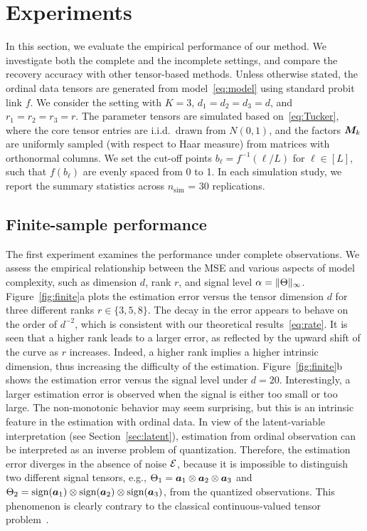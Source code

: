 \documentclass{article}
\theoremstyle{plain}
\theoremstyle{definition}
\begin{document}
\section{Experiments}\label{sec:experiment}
In this section, we evaluate the empirical performance of our method. We investigate both the complete and the incomplete settings, and compare the recovery accuracy with other tensor-based methods. Unless otherwise stated, the ordinal data tensors are generated from model~\eqref{eq:model} using standard probit link $f$. We consider the setting with $K=3$, $d_1=d_2=d_3=d$, and $r_1=r_2=r_3=r$. The parameter tensors are simulated based on~\eqref{eq:Tucker}, where the core tensor entries are i.i.d.\ drawn from $N(0,1)$, and the factors $\bm M_k$ are uniformly sampled (with respect to Haar measure) from matrices with orthonormal columns. We set the cut-off points $b_\ell=f^{-1}(\ell/L)$ for $\ell\in[L]$, such that $f(b_\ell)$ are evenly spaced from 0 to 1. In each simulation study, we report the summary statistics across $n_{\text{sim}}$ = 30 replications. 


\subsection{Finite-sample performance}\label{sec:simulation}

The first experiment examines the performance under complete observations. We assess the empirical relationship between the MSE and various aspects of model complexity, such as dimension $d$, rank $r$, and signal level $\alpha=\lVert\Theta\rVert_\infty$. Figure~\ref{fig:finite}a plots the estimation error versus the tensor dimension $d$ for three different ranks $r\in\{3,5,8\}$. The decay in the error appears to behave on the order of $d^{-2}$, which is consistent with our theoretical results~\eqref{eq:rate}. It is seen that a higher rank leads to a larger error, as reflected by the upward shift of the curve as $r$ increases. Indeed, a higher rank implies a higher intrinsic dimension, thus increasing the difficulty of the estimation. Figure~\ref{fig:finite}b shows the estimation error versus the signal level under $d=20$. Interestingly, a larger estimation error is observed when the signal is either too small or too large. The non-monotonic behavior may seem surprising, but this is an intrinsic feature in the estimation with ordinal data. In view of the latent-variable interpretation (see Section~\ref{sec:latent}), estimation from ordinal observation can be interpreted as an inverse problem of quantization. Therefore, the estimation error diverges in the absence of noise $\mathcal{E}$, because it is impossible to distinguish two different signal tensors, e.g., $\Theta_1=\bm{a}_1\otimes \bm{a}_2\otimes \bm{a}_3$ and $\Theta_2=\text{sign}(\bm{a}_1)\otimes \text{sign}(\bm{a}_2)\otimes \text{sign}(\bm{a}_3)$, from the quantized observations. This phenomenon is clearly contrary to the classical continuous-valued tensor problem~\cite{davenport2014,sur2018modern}.
\end{document}
